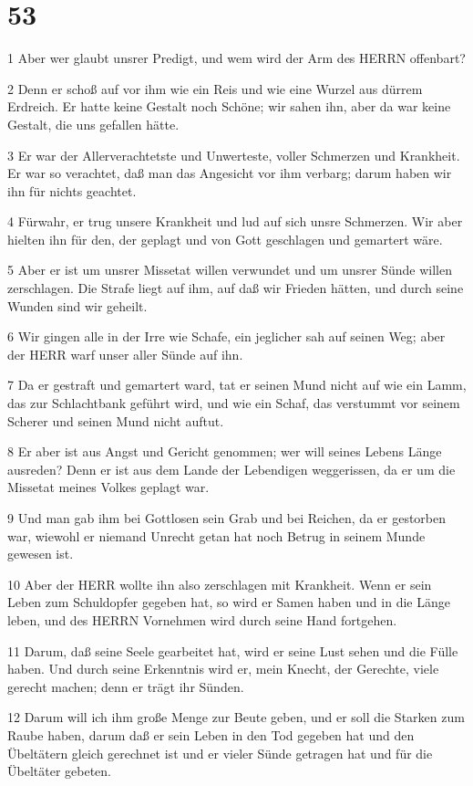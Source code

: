 \chapter{53}

\par 1 Aber wer glaubt unsrer Predigt, und wem wird der Arm des HERRN offenbart?
\par 2 Denn er schoß auf vor ihm wie ein Reis und wie eine Wurzel aus dürrem Erdreich. Er hatte keine Gestalt noch Schöne; wir sahen ihn, aber da war keine Gestalt, die uns gefallen hätte.
\par 3 Er war der Allerverachtetste und Unwerteste, voller Schmerzen und Krankheit. Er war so verachtet, daß man das Angesicht vor ihm verbarg; darum haben wir ihn für nichts geachtet.
\par 4 Fürwahr, er trug unsere Krankheit und lud auf sich unsre Schmerzen. Wir aber hielten ihn für den, der geplagt und von Gott geschlagen und gemartert wäre.
\par 5 Aber er ist um unsrer Missetat willen verwundet und um unsrer Sünde willen zerschlagen. Die Strafe liegt auf ihm, auf daß wir Frieden hätten, und durch seine Wunden sind wir geheilt.
\par 6 Wir gingen alle in der Irre wie Schafe, ein jeglicher sah auf seinen Weg; aber der HERR warf unser aller Sünde auf ihn.
\par 7 Da er gestraft und gemartert ward, tat er seinen Mund nicht auf wie ein Lamm, das zur Schlachtbank geführt wird, und wie ein Schaf, das verstummt vor seinem Scherer und seinen Mund nicht auftut.
\par 8 Er aber ist aus Angst und Gericht genommen; wer will seines Lebens Länge ausreden? Denn er ist aus dem Lande der Lebendigen weggerissen, da er um die Missetat meines Volkes geplagt war.
\par 9 Und man gab ihm bei Gottlosen sein Grab und bei Reichen, da er gestorben war, wiewohl er niemand Unrecht getan hat noch Betrug in seinem Munde gewesen ist.
\par 10 Aber der HERR wollte ihn also zerschlagen mit Krankheit. Wenn er sein Leben zum Schuldopfer gegeben hat, so wird er Samen haben und in die Länge leben, und des HERRN Vornehmen wird durch seine Hand fortgehen.
\par 11 Darum, daß seine Seele gearbeitet hat, wird er seine Lust sehen und die Fülle haben. Und durch seine Erkenntnis wird er, mein Knecht, der Gerechte, viele gerecht machen; denn er trägt ihr Sünden.
\par 12 Darum will ich ihm große Menge zur Beute geben, und er soll die Starken zum Raube haben, darum daß er sein Leben in den Tod gegeben hat und den Übeltätern gleich gerechnet ist und er vieler Sünde getragen hat und für die Übeltäter gebeten.

